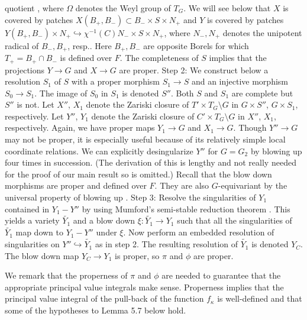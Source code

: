 quotient \cite{Slo}, where $\Omega$ denotes the Weyl group of $T_G$.
We will see below that $X$ is covered by patches 
$X(B_+ ,B_{-})\subset
B_{-}\times S\times N_+$ and $Y$ is covered by patches 
$Y(B_+ ,B_-)\times N_+\hookrightarrow \chi^{-1}(C) N_-\times S\times N_+$,
where $N_-,N_+$ denotes the unipotent radical of $B_-,B_+$, resp..
Here $B_+,B_-$ are opposite Borels for which
$T_+=B_+\cap B_-$ is defined over $F$. The completeness
of $S$ implies that the projections $Y\rightarrow G$
and $X\rightarrow G$ are proper.     
\newline
Step 2: We construct below a resolution $S_1$ of $S$ with a proper
morphism $S_1\rightarrow S$ and an injective morphism
$S_0\rightarrow S_1$. The image of $S_0$ in $S_1$ is denoted $S''$.
Both $S$ and $S_1$ are complete but $S''$ is not.
Let $X''$, $X_1$ denote the Zariski closure of $T'\times T_G\setminus G$
in $G\times S''$, $G\times S_1$, respectively. 
Let $Y''$, $Y_1$ denote the Zariski closure of $C'\times T_G\setminus G$
in $X''$, $X_1$, respectively. Again, we have proper maps
$Y_1\rightarrow G$ and $X_1\rightarrow G$. Though $Y''\rightarrow G$
may not be proper, it is especially useful because
of its relatively simple local coordinate relations. We can explicitly
desingularize $Y''$ for $G=G_2$ by blowing up four
times in succession. 
(The derivation of this is lengthy and not really needed for the
proof of our main result so is omitted.)
Recall that the blow down morphisms
are proper and defined over $F$. They are also $G$-equivariant
by the universal property of blowing up \cite{Har}.
\newline
Step 3: Resolve the singularities of $Y_1$ contained in
$Y_1-Y''$ by using Mumford's semi-stable reduction theorem \cite{K}.
This yields a variety $\tilde{Y_1}$ and a blow down
$\xi:\tilde{Y_1}\rightarrow Y_1$ such that all the singularities 
of $\tilde{Y_1}$ map down to $Y_1- Y''$ under $\xi$. Now
perform an embedded resolution of singularities on  
$Y''\hookrightarrow \tilde{Y_1}$ as in step 2. The resulting
resolution of $\tilde{Y_1}$
is denoted $Y_C$. The blow down map $Y_C\rightarrow Y_1$
is proper, so $\pi$ and $\phi$ are proper. 
\par
We remark that the properness of $\pi$ and
$\phi$ are needed to guarantee that the appropriate
principal value integrals make sense. Properness implies that 
the principal value integral of the
pull-back of the function $f_\kappa$ is well-defined
and that some of the hypotheses to Lemma 5.7 below hold.

